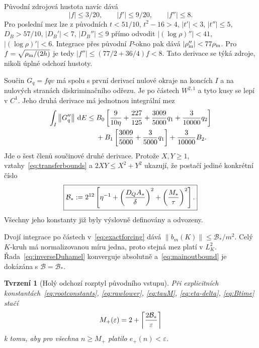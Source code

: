\documentclass[11pt,a4paper]{article}
\newcommand{\norm}[1]{\left\lVert#1\right\rVert}
\newcommand{\dd}{\,\mathrm d}
\newtheorem{theorem}{Tvrzení}[section]
\theoremstyle{remark}\newtheorem{remark}[theorem]{Poznámka}
\numberwithin{equation}{section}
\begin{document}
Původní zdrojová hustota navíc dává
\begin{equation}
|f|\le3/20,\qquad |f'|\le9/20,\qquad |f''|\le8.
\label{eq:fsecond}
\end{equation}
Pro poslední mez lze z původních \(t<51/10\), \(t^2-16>4\), \(|t'|<3\), \(|t''|\le5\), \(D_B>57/10\), \(|D_B'|<7\), \(|D_B''|\le9\) přímo odvodit \(|(\log\rho)''|<41\), \(|(\log\rho)'|<6\). Integrace přes původní \(P\)-okno pak dává \(|\rho_{\rm in}''|<77\rho_{\rm in}\). Pro \(f=\sqrt{\rho_{\rm in}/(2h)}\) je tedy \(|f''|\le(77/2+36/4)f<8\). Tato derivace se týká zdroje, nikoli úplné odchozí hustoty.

Součin \(G_q=fqv\) má spolu s první derivací nulové okraje na koncích \(I\) a na nulových stranách diskriminačního odřezu. Je po částech \(W^{2,1}\) a tyto kusy se lepí v \(C^1\). Jeho druhá derivace má jednotnou integrální mez
\begin{align}
\int_I\norm{G_q''}\dd E\le{}&
B_0\left[{9\over10\eta}+{227\over125}
 +{3009\over5000}q_1+{3\over10000}q_2\right]\notag\\
&+B_1\left[{3009\over5000}+{3\over5000}q_1\right]
 +{3\over10000}B_2.
\label{eq:Gsecond}
\end{align}
Jde o šest členů součinové druhé derivace. Protože \(X,Y\ge1\), vztahy~\eqref{eq:transferbounds} a \(2XY\le X^2+Y^2\) ukazují, že postačí jediné konkrétní číslo
\begin{equation}
\boxed{\mathcal B_*:=2^{12}\left[
\eta^{-1}+\left({D_QA_*\over\delta}\right)^2
 +\left({M_*\over\tau}\right)^2\right].}
\label{eq:Btime}
\end{equation}
Všechny jeho konstanty již byly výslovně definovány a odvozeny.

Dvojí integrace po částech v~\eqref{eq:exactforcing} dává \(\norm{b_m(K)}\le\mathcal B_*/m^2\). Celý \(K\)-kruh má normalizovanou míru jedna, proto stejná mez platí v \(L^2_K\). Řada~\eqref{eq:inverseDuhamel} konverguje absolutně a~\eqref{eq:mainoutbound} je dokázána s \(\mathcal B=\mathcal B_*\).

\begin{theorem}[Holý odchozí rozptyl původního vstupu]
Při explicitních konstantách~\eqref{eq:rootconstants}, \eqref{eq:rawlower}, \eqref{eq:tauM}, \eqref{eq:eta-delta}, \eqref{eq:Btime} stačí
\begin{equation}
M_+(\varepsilon)=2+\left\lceil{2\mathcal B_*\over\varepsilon}\right\rceil
\label{eq:Mexact}
\end{equation}
k tomu, aby pro všechna \(n\ge M_+\) platilo
\(\boxed{e_+(n)<\varepsilon}\).
\end{theorem}
\end{document}
